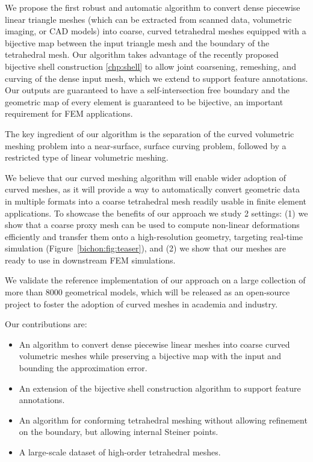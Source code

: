 We propose the first robust and automatic algorithm to convert dense piecewise linear triangle meshes (which can be extracted from scanned data, volumetric imaging, or CAD models) into coarse, curved tetrahedral meshes equipped with a bijective map between the input triangle mesh and the boundary of the tetrahedral mesh. Our algorithm takes advantage of the recently proposed bijective shell construction \ref{chp:shell} to allow joint coarsening, remeshing, and curving of the dense input mesh, which we extend to support feature annotations.
Our outputs are guaranteed to have a self-intersection free boundary and the geometric map of every element is guaranteed to be bijective, an important requirement for FEM applications.

The key ingredient of our algorithm is the separation of the curved volumetric meshing problem into a near-surface, surface curving problem, followed by a restricted type of linear volumetric meshing. 


We believe that our curved meshing algorithm will enable wider adoption of curved meshes, as it will provide a way to automatically convert geometric data in multiple formats into a coarse tetrahedral mesh readily usable in finite element applications. To showcase the benefits of our approach we study 2 settings: (1) we show that a coarse proxy mesh can be used to compute non-linear deformations efficiently and transfer them onto a high-resolution geometry, targeting real-time simulation (Figure~\ref{bichon:fig:teaser}), and (2) 
we show that our meshes are ready to use in downstream FEM simulations.

We validate the reference implementation of our approach on a large collection of more than 8000 geometrical models, which will be released as an open-source project to foster the adoption of curved meshes in academia and industry.

Our contributions are:
\begin{itemize}
    \item An algorithm to convert dense piecewise linear meshes into coarse curved volumetric meshes while preserving a bijective map with the input and bounding the approximation error.
    \item An extension of the bijective shell construction algorithm to support feature {annotations}.
    \item An algorithm for conforming tetrahedral meshing without allowing refinement on the boundary, but allowing internal Steiner points.
    \item A large-scale dataset of high-order tetrahedral meshes.
\end{itemize}